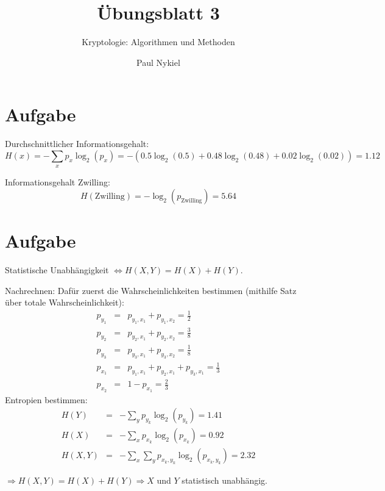 \documentclass[DIN, pagenumber=false, fontsize=11pt, parskip=half]{scrartcl}
\title{Übungsblatt 3}
\subtitle{Kryptologie: Algorithmen und Methoden}
\author{Paul Nykiel}
\begin{document}
    \maketitle
    \section{Aufgabe}
    Durchschnittlicher Informationsgehalt:
    \begin{equation}
        H(x) = -\sum_x p_x \log_2(p_x) = - \left(0.5 \log_2(0.5) + 0.48 \log_2(0.48) + 0.02 \log_2(0.02)\right) = 1.12
    \end{equation}

    Informationsgehalt \glqq{}Zwilling\grqq{}:
    \begin{equation}
        H(\text{Zwilling}) = -\log_2(p_\text{Zwilling}) = 5.64
    \end{equation}

    \section{Aufgabe}
    Statistische Unabhängigkeit $\Leftrightarrow H(X, Y) = H(X) + H(Y)$.
    
    Nachrechnen: Dafür zuerst die Wahrscheinlichkeiten bestimmen (mithilfe Satz über totale Wahrscheinlichkeit):
    \begin{eqnarray*}
        p_{y_1} &=& p_{y_1, x_1} + p_{y_1, x_2} = \frac{1}{2} \\
        p_{y_2} &=& p_{y_2, x_1} + p_{y_2, x_2} = \frac{3}{8} \\
        p_{y_3} &=& p_{y_3, x_1} + p_{y_3, x_2} = \frac{1}{8} \\
        p_{x_1} &=& p_{y_1, x_1} + p_{y_2, x_1} + p_{y_3, x_1} = \frac{1}{3} \\
        p_{x_2} &=& 1 - p_{x_1} = \frac{2}{3}
    \end{eqnarray*}
    Entropien bestimmen:
    \begin{eqnarray*}
        H(Y) &=& -\sum_y p_{y_k} \log_2(p_{y_k}) = 1.41 \\
        H(X) &=& -\sum_x p_{x_k} \log_2(p_{x_k}) = 0.92 \\
        H(X,Y) &=& -\sum_x \sum_y p_{x_k, y_k} \log_2 (p_{x_k, y_k}) = 2.32
    \end{eqnarray*}

    $\Rightarrow H(X, Y) = H(X) + H(Y) \Rightarrow X$ und $Y$ statistisch unabhängig.
\end{document}
